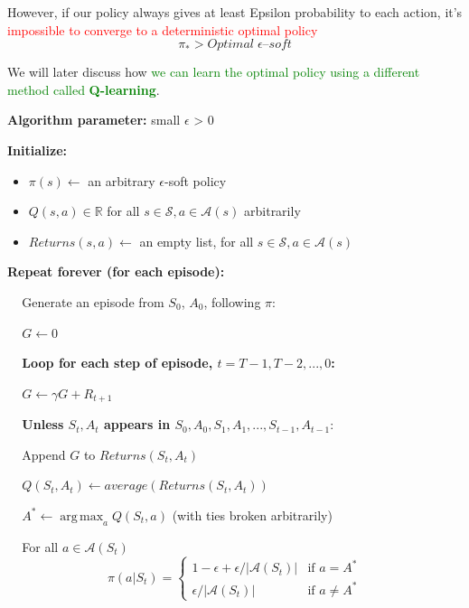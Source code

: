 \documentclass[12pt, a4paper]{article}
\DeclareMathOperator*{\argmax}{arg\,max} %
\begin{document}
However, if our policy always gives at least Epsilon probability to each action, it's \textcolor{Red}{impossible to converge to a deterministic optimal policy}
$$
\pi_* > Optimal\;\epsilon–soft
$$


We will later discuss how \textcolor{Green}{we can learn the optimal policy using a different method called \textbf{Q-learning}}.


\begin{tcolorbox}[title={On-policy first-visit MC control (for $\epsilon$-soft policies), estimates $\pi \approx \pi_*$}]

\textbf{Algorithm parameter:} small $\epsilon$ > 0

\textbf{Initialize:}
\begin{itemize}
 \item $\pi(s) \leftarrow$ an arbitrary $\epsilon$-soft policy
 \item $Q(s,a) \in \mathbb{R}$ for all $s \in \mathcal{S}, a \in \mathcal{A}(s)$ arbitrarily
 \item $Returns(s,a) \leftarrow$ an empty list, for all $s \in \mathcal{S}, a \in \mathcal{A}(s)$
\end{itemize}

\textbf{Repeat forever (for each episode):}
\begin{description}
   \item $\;\;\;$ Generate an episode from $S_0$, $A_0$, following $\pi$:
   \item $\;\;\;$ $G \leftarrow 0$
   \item $\;\;\;$ \textbf{Loop for each step of episode, $t=T-1,T-2,...,0$:}
   \begin{description}
     \item $\;\;\;$ $G \leftarrow \gamma G + R_{t+1}$
     \item $\;\;\;$ \textbf{Unless $S_t, A_t$ appears in $S_0, A_0, S_1, A_1, ..., S_{t-1}, A_{t-1}:$}
     \begin{description}
       \item $\;\;\;$ Append $G$ to $Returns(S_t, A_t)$
       \item $\;\;\;$ $Q(S_t, A_t) \leftarrow average(Returns(S_t, A_t))$
       \item $\;\;\;$ $A^* \leftarrow \argmax_a Q(S_t,a)$     (with ties broken arbitrarily)
       \item $\;\;\;$ For all $a \in \mathcal{A}(S_t)$
       $$
       \pi(a|S_t)=
        \begin{cases}
           1-\epsilon + \epsilon / |\mathcal{A}(S_t)| & \text{if } a = A^* \\
          \epsilon / |\mathcal{A}(S_t)| & \text{if } a \neq A^*
        \end{cases}
       $$
     \end{description}
   \end{description}
\end{description}
\end{tcolorbox}
\end{document}
